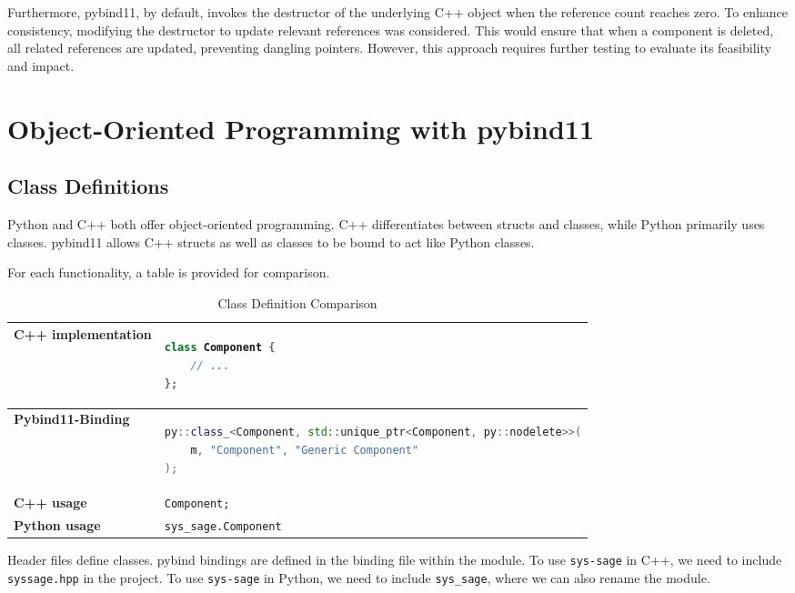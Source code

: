 Furthermore, pybind11, by default, invokes the destructor of the underlying C++ object when the reference count reaches zero. To enhance consistency, modifying the destructor to update relevant references was considered. This would ensure that when a component is deleted, all related references are updated, preventing dangling pointers. However, this approach requires further testing to evaluate its feasibility and impact.
\section{Object-Oriented Programming with pybind11}

\subsection{Class Definitions}

Python and C++ both offer object-oriented programming. C++ differentiates between structs and classes, while Python primarily uses classes. pybind11 allows C++ structs as well as classes to be bound to act like Python classes.

For each functionality, a table is provided for comparison.

\begin{table}[htbp]
\centering
\begin{tabular}{|l|l|}
\hline
\textbf{C++ implementation} &
\begin{lstlisting}[language=C++]
class Component {
    // ...
};
\end{lstlisting}
\\ \hline
\textbf{Pybind11-Binding} &
\begin{lstlisting}[language=C++]
py::class_<Component, std::unique_ptr<Component, py::nodelete>>(
    m, "Component", "Generic Component"
);
\end{lstlisting}
\\ \hline
\textbf{C++ usage} &
\verb|Component;| \\ \hline
\textbf{Python usage} &
\verb|sys_sage.Component| \\ \hline
\end{tabular}
\caption{Class Definition Comparison}
\label{tab:class_definition}
\end{table}

Header files define classes. pybind bindings are defined in the binding file within the module. To use \verb|sys-sage| in C++, we need to include \verb|syssage.hpp| in the project. To use \verb|sys-sage| in Python, we need to include \verb|sys_sage|, where we can also rename the module.

